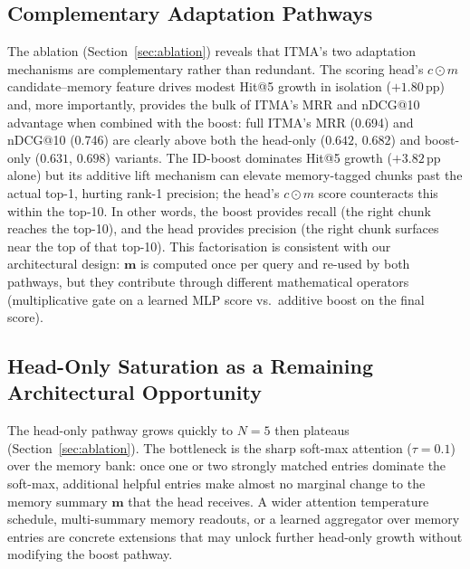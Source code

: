 \documentclass[journal]{IEEEtran}
\begin{document}
\subsection{Complementary Adaptation Pathways}
The ablation (Section~\ref{sec:ablation}) reveals that ITMA's two
adaptation mechanisms are complementary rather than redundant.  The
scoring head's $c{\odot}m$ candidate--memory feature drives modest
Hit@5 growth in isolation ($+1.80$\,pp) and, more importantly,
provides the bulk of ITMA's MRR and nDCG@10 advantage when combined
with the boost: full ITMA's MRR (0.694) and nDCG@10 (0.746) are
clearly above both the head-only ($0.642$, $0.682$) and boost-only
($0.631$, $0.698$) variants.  The ID-boost dominates Hit@5 growth
($+3.82$\,pp alone) but its additive lift mechanism can elevate
memory-tagged chunks past the actual top-1, hurting rank-1 precision;
the head's $c{\odot}m$ score counteracts this within the top-10.  In
other words, the boost provides recall (the right chunk reaches the
top-10), and the head provides precision (the right chunk surfaces
near the top of that top-10).  This factorisation is consistent with
our architectural design: $\mathbf{m}$ is computed once per query and
re-used by both pathways, but they contribute through different
mathematical operators (multiplicative gate on a learned MLP score
vs.\ additive boost on the final score).

\subsection{Head-Only Saturation as a Remaining Architectural
Opportunity}
The head-only pathway grows quickly to $N{=}5$ then plateaus
(Section~\ref{sec:ablation}).  The bottleneck is the sharp soft-max
attention ($\tau{=}0.1$) over the memory bank: once one or two
strongly matched entries dominate the soft-max, additional helpful
entries make almost no marginal change to the memory summary
$\mathbf{m}$ that the head receives.  A wider attention temperature
schedule, multi-summary memory readouts, or a learned aggregator over
memory entries are concrete extensions that may unlock further
head-only growth without modifying the boost pathway.
\end{document}
